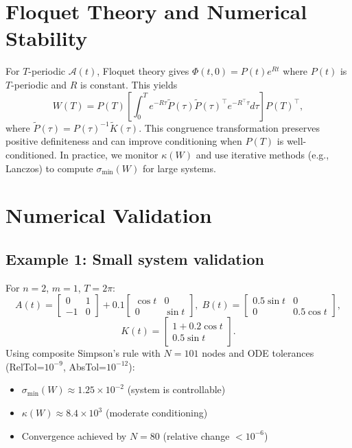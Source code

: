 \documentclass[5p,times]{elsarticle} %
\newcommand{\Ktil}{\widetilde{K}}
\newcommand{\Acal}{\mathcal{A}}
\begin{document}
\section{Floquet Theory and Numerical Stability}
For \(T\)-periodic \(\Acal(t)\), Floquet theory gives \(\Phi(t,0)=P(t)e^{Rt}\) where \(P(t)\) is \(T\)-periodic and \(R\) is constant. This yields
\begin{equation}
W(T)=P(T)\left[\int_0^T e^{-R\tau}\widetilde{P}(\tau)\widetilde{P}(\tau)^\top e^{-R^\top\tau}d\tau\right]P(T)^\top,
\end{equation}
where \(\widetilde{P}(\tau)=P(\tau)^{-1}\Ktil(\tau)\). This congruence transformation preserves positive definiteness and can improve conditioning when \(P(T)\) is well-conditioned. In practice, we monitor \(\kappa(W)\) and use iterative methods (e.g., Lanczos) to compute \(\sigma_{\min}(W)\) for large systems.

\section{Numerical Validation}
\subsection{Example 1: Small system validation}
For \(n=2\), \(m=1\), \(T=2\pi\):
\[
A(t)=\begin{bmatrix}0&1\\-1&0\end{bmatrix}+0.1\begin{bmatrix}\cos t&0\\0&\sin t\end{bmatrix},\;
B(t)=\begin{bmatrix}0.5\sin t&0\\0&0.5\cos t\end{bmatrix},
\]
\[
K(t)=\begin{bmatrix}1+0.2\cos t \\ 0.5\sin t\end{bmatrix}.
\]
Using composite Simpson's rule with \(N=101\) nodes and ODE tolerances (RelTol=\(10^{-9}\), AbsTol=\(10^{-12}\)):
\begin{itemize}
\item \(\sigma_{\min}(W)\approx 1.25\times 10^{-2}\) (system is controllable)
\item \(\kappa(W)\approx 8.4\times 10^{3}\) (moderate conditioning)
\item Convergence achieved by \(N=80\) (relative change \(<10^{-6}\))
\end{itemize}
\end{document}
